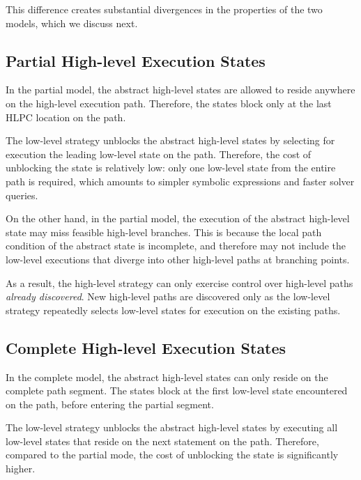 This difference creates substantial divergences in the properties of the two models, which we discuss next.

\subsection{Partial High-level Execution States}

In the partial model, the abstract high-level states are allowed to reside anywhere on the high-level execution path.
%
Therefore, the states block only at the last HLPC location on the path.

The low-level strategy unblocks the abstract high-level states by selecting for execution the leading low-level state on the path.
%
Therefore, the cost of unblocking the state is relatively low: only one low-level state from the entire path is required, which amounts to simpler symbolic expressions and faster solver queries.

On the other hand, in the partial model, the execution of the abstract high-level state may miss feasible high-level branches.
%
This is because the local path condition of the abstract state is incomplete, and therefore may not include the low-level executions that diverge into other high-level paths at branching points.

As a result, the high-level strategy can only exercise control over high-level paths \emph{already discovered}.
%
New high-level paths are discovered only as the low-level strategy repeatedly selects low-level states for execution on the existing paths.


\subsection{Complete High-level Execution States}

In the complete model, the abstract high-level states can only reside on the complete path segment.
%
The states block at the first low-level state encountered on the path, before entering the partial segment.

The low-level strategy unblocks the abstract high-level states by executing all low-level states that reside on the next statement on the path.
%
Therefore, compared to the partial mode, the cost of unblocking the state is significantly higher.

